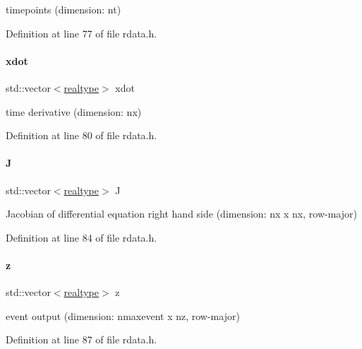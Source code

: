 timepoints (dimension\+: nt) 

Definition at line 77 of file rdata.\+h.

\mbox{\label{classamici_1_1_return_data_a40cb7399c56187d0b119e89a82d9f4ac}} 
\paragraph{\texorpdfstring{xdot}{xdot}}
{\footnotesize\ttfamily std\+::vector$<$\mbox{\hyperlink{namespaceamici_a1bdce28051d6a53868f7ccbf5f2c14a3}{realtype}}$>$ xdot}

time derivative (dimension\+: nx) 

Definition at line 80 of file rdata.\+h.

\mbox{\label{classamici_1_1_return_data_a6eee8c09315a85f7213d679fcb2aef85}} 
\paragraph{\texorpdfstring{J}{J}}
{\footnotesize\ttfamily std\+::vector$<$\mbox{\hyperlink{namespaceamici_a1bdce28051d6a53868f7ccbf5f2c14a3}{realtype}}$>$ J}

Jacobian of differential equation right hand side (dimension\+: nx x nx, row-\/major) 

Definition at line 84 of file rdata.\+h.

\mbox{\label{classamici_1_1_return_data_a8ed223273385c1e7fff94cfa8ca81d45}} 
\paragraph{\texorpdfstring{z}{z}}
{\footnotesize\ttfamily std\+::vector$<$\mbox{\hyperlink{namespaceamici_a1bdce28051d6a53868f7ccbf5f2c14a3}{realtype}}$>$ z}

event output (dimension\+: nmaxevent x nz, row-\/major) 

Definition at line 87 of file rdata.\+h.

